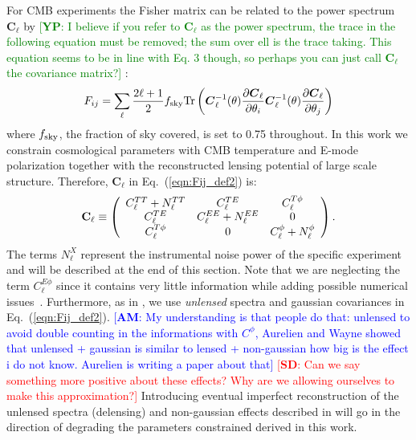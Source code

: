 \documentclass[aps,prd,reprint,superscriptaddress]{revtex4-1}
\newcommand{\sd}[1]{\textcolor{red}{[{\bf SD}: #1]}}
\newcommand{\am}[1]{\textcolor{blue}{[{\bf AM}: #1]}}
\newcommand{\yp}[1]{\textcolor{green}{[{\bf YP}: #1]}}
\newcommand\refeq[1]{Eq.~(\ref{eqn:#1})}
\begin{document}
For CMB experiments the Fisher matrix can be related to the power spectrum $\boldsymbol{C}_\ell$ by \yp{I believe if you refer to $\boldsymbol{C}_\ell$ as the power spectrum, the trace in the following equation must be removed; the sum over ell is the trace taking. This equation seems to be in line with Eq. 3 though, so perhaps you can just call $\boldsymbol{C}_\ell$ the covariance matrix?} :
\begin{equation}
 F_{ij} = \sum_\ell \frac{2\ell+1}{2} f_{\rm sky} {\rm Tr} \left(  \boldsymbol{C}^{-1}_\ell( \theta) \frac{\partial \boldsymbol{C}_\ell}{\partial \theta_i} \boldsymbol{C}^{-1}_\ell( \theta) \frac{\partial \boldsymbol{C}_\ell}{\partial \theta_j}  \right)
 \label{eqn:Fij_def2}
 \end{equation}
 where $f_{\rm sky}$, the fraction of sky covered, is set to 0.75 throughout.
In this work we constrain cosmological parameters with CMB temperature and E-mode polarization together with the reconstructed lensing potential of large scale structure. Therefore, $\boldsymbol{C}_\ell$ in \refeq{Fij_def2} is:
 \begin{eqnarray}
 	\centering
		\mathbf{C}_\ell \equiv \left( \begin{array}{ccc}C_\ell^{TT} + N_\ell^{TT} & C_\ell^{TE} & C_\ell^{T\phi} \\ C_\ell^{TE} & C_\ell^{EE} + N_\ell^{EE} & 0 \\ C_\ell^{T\phi} & 0 & C_\ell^{\phi} + N_\ell^{\phi}\end{array}\right).
	\label{eqn:cov_definition}
\end{eqnarray}
The terms $N_\ell^{X}$ represent the instrumental noise power of the specific experiment and will be described at the end of this section.
Note that we are neglecting the term $C_\ell^{E\phi}$ since it  contains very little information while adding possible numerical issues~\cite{wu:2014,2013PhRvD..87h3008H}.
Furthermore, as in \cite{wu:2014}, we use \textit{unlensed} spectra and gaussian covariances in \refeq{Fij_def2}. 
\am{My understanding is that people do that: unlensed to avoid double counting in the informations with $C^{\phi}$, Aurelien and Wayne showed that unlensed + gaussian is similar to lensed + non-gaussian how big is the effect i do not know. Aurelien is writing a paper about that}
\sd{Can we say something more positive about these effects? Why are we allowing ourselves to make this approximation?} Introducing eventual imperfect reconstruction of the unlensed spectra (delensing) and non-gaussian effects described in \cite{benoit-levy:2012} will go in the direction of degrading the parameters constrained derived in this work.
\end{document}
